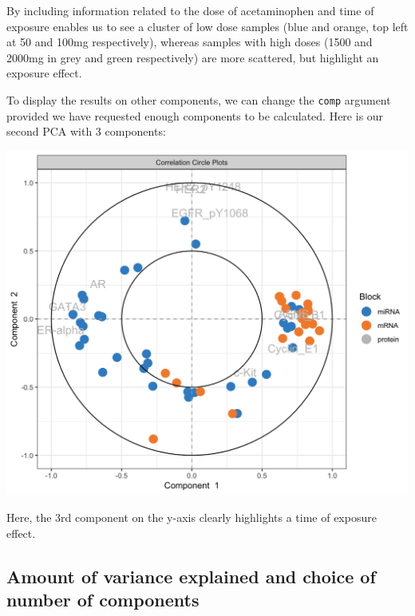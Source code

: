 \documentclass[]{book}
\newenvironment{Shaded}{\begin{snugshade}}{\end{snugshade}}
\newcommand{\KeywordTok}[1]{\textcolor[rgb]{0.13,0.29,0.53}{\textbf{#1}}}
\newcommand{\DataTypeTok}[1]{\textcolor[rgb]{0.13,0.29,0.53}{#1}}
\newcommand{\DecValTok}[1]{\textcolor[rgb]{0.00,0.00,0.81}{#1}}
\newcommand{\StringTok}[1]{\textcolor[rgb]{0.31,0.60,0.02}{#1}}
\newcommand{\OtherTok}[1]{\textcolor[rgb]{0.56,0.35,0.01}{#1}}
\newcommand{\OperatorTok}[1]{\textcolor[rgb]{0.81,0.36,0.00}{\textbf{#1}}}
\newcommand{\NormalTok}[1]{#1}
\theoremstyle{definition}
\theoremstyle{definition}
\theoremstyle{definition}
\theoremstyle{remark}
\begin{document}
By including information related to the dose of acetaminophen and time
of exposure enables us to see a cluster of low dose samples (blue and
orange, top left at 50 and 100mg respectively), whereas samples with
high doses (1500 and 2000mg in grey and green respectively) are more
scattered, but highlight an exposure effect.

To display the results on other components, we can change the
\texttt{comp} argument provided we have requested enough components to
be calculated. Here is our second PCA with 3 components:

\begin{Shaded}
\end{Shaded}

\begin{center}\includegraphics[width=0.5\linewidth]{Figures/unnamed-chunk-5-1} \end{center}

Here, the 3rd component on the y-axis clearly highlights a time of
exposure effect.

\subsection{Amount of variance explained and choice of number of
components}\label{amount-of-variance-explained-and-choice-of-number-of-components}
\end{document}
